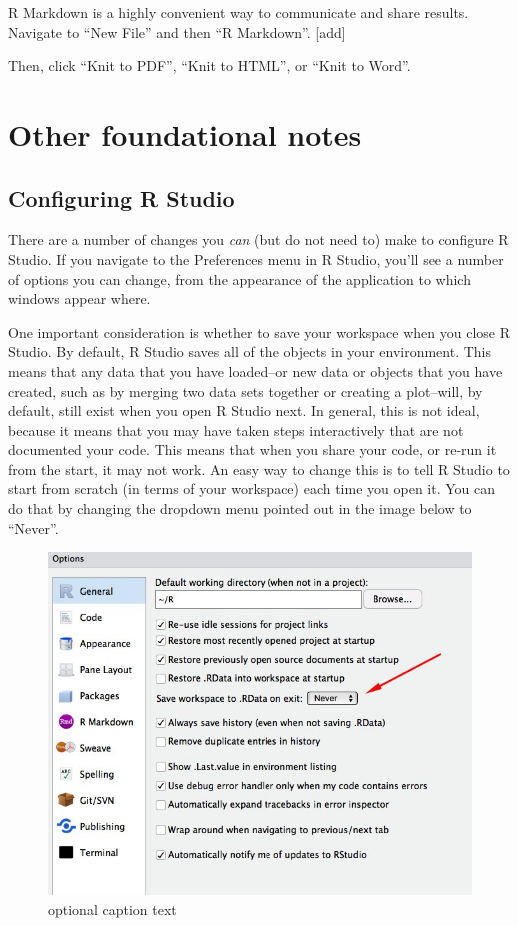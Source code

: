 \documentclass[]{book}
\begin{document}
R Markdown is a highly convenient way to communicate and share results.
Navigate to ``New File'' and then ``R Markdown''. {[}add{]}

Then, click ``Knit to PDF'', ``Knit to HTML'', or ``Knit to Word''.

\section{Other foundational notes}\label{other-foundational-notes}

\subsection{Configuring R Studio}\label{configuring-r-studio}

There are a number of changes you \emph{can} (but do not need to) make
to configure R Studio. If you navigate to the Preferences menu in R
Studio, you'll see a number of options you can change, from the
appearance of the application to which windows appear where.

One important consideration is whether to save your workspace when you
close R Studio. By default, R Studio saves all of the objects in your
environment. This means that any data that you have loaded--or new data
or objects that you have created, such as by merging two data sets
together or creating a plot--will, by default, still exist when you open
R Studio next. In general, this is not ideal, because it means that you
may have taken steps interactively that are not documented your code.
This means that when you share your code, or re-run it from the start,
it may not work. An easy way to change this is to tell R Studio to start
from scratch (in terms of your workspace) each time you open it. You can
do that by changing the dropdown menu pointed out in the image below to
``Never''.

\begin{figure}
\centering
\includegraphics{images/save-workspace-reminder.jpg}
\caption{optional caption text}
\end{figure}
\end{document}

